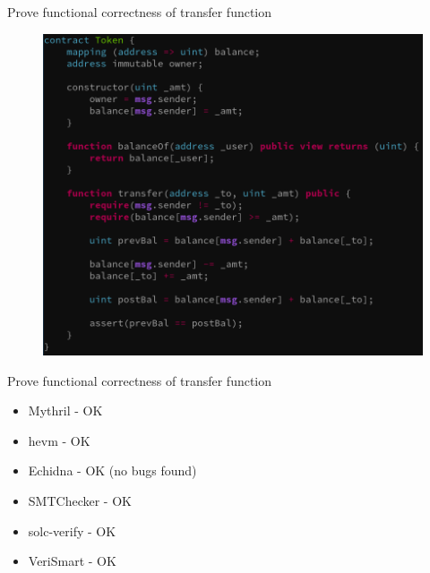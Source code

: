 \documentclass[aspectratio=169,10pt]{beamer}
\begin{document}
\begin{frame}[fragile]
\begin{center}
Prove functional correctness of transfer function
\begin{figure}
	\includegraphics[scale=0.3]{images/token_pass}
\end{figure}
\end{center}
\end{frame}

\begin{frame}[fragile]
\begin{center}
Prove functional correctness of transfer function
\begin{itemize}
\item Mythril - OK
\item hevm - OK
\item Echidna - OK (no bugs found)
\item SMTChecker - OK
\item solc-verify - OK
\item VeriSmart - OK
\end{itemize}
\end{center}
\end{frame}
\end{document}
